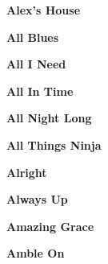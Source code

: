 \vspace{10pt} 
\begin{center}\textbf{Alex's House}\end{center}
\newline
\vspace{10pt} 
\begin{center}\textbf{All Blues}\end{center}
\newline
\vspace{10pt} 
\begin{center}\textbf{All I Need}\end{center}
\newline
\vspace{10pt} 
\begin{center}\textbf{All In Time}\end{center}
\newline
\vspace{10pt} 
\begin{center}\textbf{All Night Long}\end{center}
\newline
\vspace{10pt} 
\begin{center}\textbf{All Things Ninja}\end{center}
\newline
\vspace{10pt} 
\begin{center}\textbf{Alright}\end{center}
\newline
\vspace{10pt} 
\begin{center}\textbf{Always Up}\end{center}
\newline
\vspace{10pt} 
\begin{center}\textbf{Amazing Grace}\end{center}
\newline
\vspace{10pt} 
\begin{center}\textbf{Amble On}\end{center}
